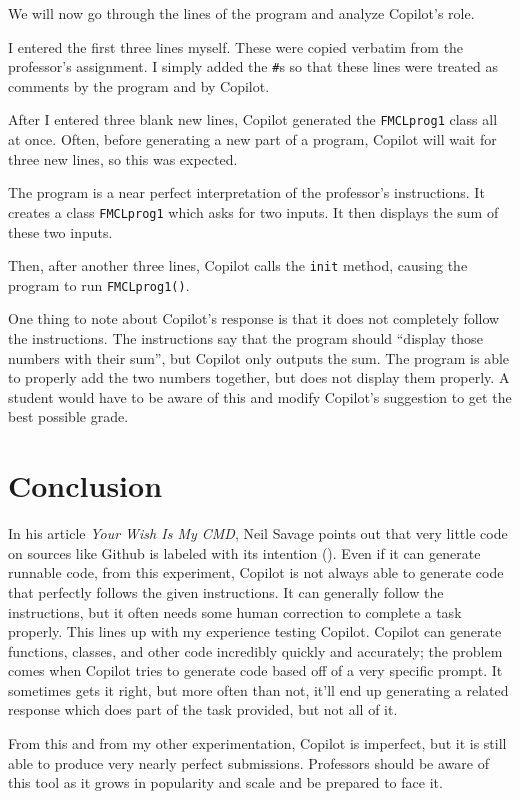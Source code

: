 \documentclass[12pt]{article}
\begin{document}
We will now go through the lines of the program and analyze Copilot's
role.

I entered the first three lines myself. These were copied verbatim from
the professor's assignment. I simply added the \texttt{\#}s so that
these lines were treated as comments by the program and by Copilot.

After I entered three blank new lines, Copilot generated the
\texttt{FMCLprog1} class all at once. Often, before generating a new
part of a program, Copilot will wait for three new lines, so this was
expected.

The program is a near perfect interpretation of the professor's
instructions. It creates a class \texttt{FMCLprog1} which asks for two
inputs. It then displays the sum of these two inputs.

Then, after another three lines, Copilot calls the \texttt{init} method,
causing the program to run \texttt{FMCLprog1()}.

One thing to note about Copilot's response is that it does not
completely follow the instructions. The instructions say that the
program should ``display those numbers with their sum'', but Copilot
only outputs the sum. The program is able to properly add the two
numbers together, but does not display them properly. A student would
have to be aware of this and modify Copilot's suggestion to get the best
possible grade.

\hypertarget{conclusion}{%
\section{Conclusion}\label{conclusion}}

In his article \emph{Your Wish Is My CMD}, Neil Savage points out that
very little code on sources like Github is labeled with its intention
(\cite{savage_2020_your}). Even if it can generate runnable code, from this
experiment, Copilot is not always able to generate code that perfectly
follows the given instructions. It can generally follow the
instructions, but it often needs some human correction to complete a
task properly. This lines up with my experience testing Copilot. Copilot
can generate functions, classes, and other code incredibly quickly and
accurately; the problem comes when Copilot tries to generate code based
off of a very specific prompt. It sometimes gets it right, but more
often than not, it'll end up generating a related response which does
part of the task provided, but not all of it.

From this and from my other experimentation, Copilot is imperfect, but
it is still able to produce very nearly perfect submissions. Professors
should be aware of this tool as it grows in popularity and scale and be
prepared to face it.

\clearpage
\nocite{*}
\printbibliography
\end{document}
